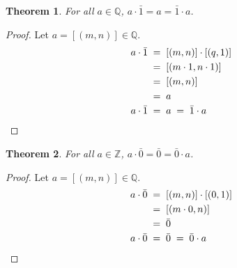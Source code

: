 \documentclass[10pt]{article}
\newtheorem{theorem}{Theorem}[section]
\theoremstyle{definition}
\theoremstyle{remark}
\newcommand{\Z}{\mathbb{Z}}
\newcommand{\Q}{\mathbb{Q}}
\begin{document}
        \begin{theorem}
                For all $a \in \Q$, $a\cdot\bar{1} = a = \bar{1}\cdot a$.
        \end{theorem}
        \begin{proof}
                Let $a = [(m, n)] \in \Q$.
                \begin{align*}
                        a\cdot \bar{1} \;&=\; [(m, n)] \cdot [(q, 1)] \\
                                \;&=\; [(m\cdot 1, n\cdot 1)] \\
                                \;&=\; [(m, n)] \\
                                \;&=\; a \\
                        a\cdot \bar{1} \;&=\; a \;=\; \bar{1}\cdot a \qedhere
                \end{align*}
        \end{proof}
        \begin{theorem}
                For all $a \in \Z$, $a\cdot \bar{0} = \bar{0} = \bar{0}\cdot a$.
        \end{theorem}
        \begin{proof}
                Let $a = [(m, n)] \in \Q$.
                \begin{align*}
                        a\cdot \bar{0} \;&=\; [(m, n)]\cdot [(0, 1)]\\
                                \;&=\; [(m\cdot 0, n)] \\
                                \;&=\; \bar{0} \\
                        a\cdot \bar{0} \;&=\; \bar{0} \;=\; \bar{0}\cdot a \qedhere
                \end{align*}
        \end{proof}
        
\end{document}
